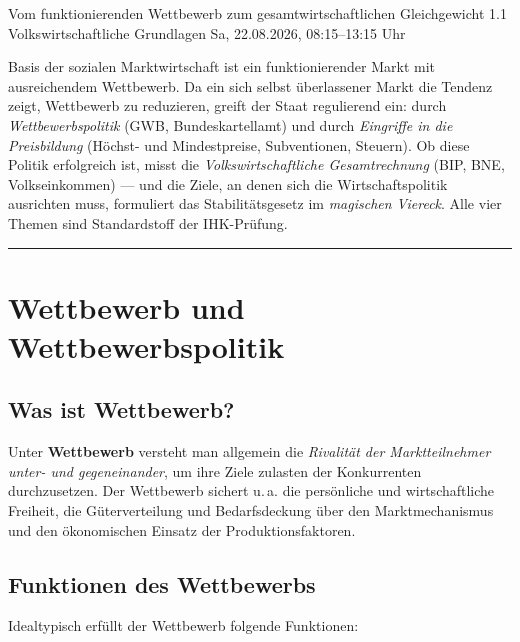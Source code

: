 \documentclass[11pt, a4paper]{article}
\begin{document}
%
  {Vom funktionierenden Wettbewerb zum gesamtwirtschaftlichen Gleichgewicht}%
  {1.1 Volkswirtschaftliche Grundlagen}%
  {Sa, 22.08.2026, 08:15--13:15 Uhr}

\begin{merksatz}[title={\bfseries Worum geht es in dieser Lektion?}]
Basis der sozialen Marktwirtschaft ist ein funktionierender Markt mit ausreichendem
Wettbewerb. Da ein sich selbst überlassener Markt die Tendenz zeigt, Wettbewerb zu
reduzieren, greift der Staat regulierend ein: durch \emph{Wettbewerbspolitik} (GWB,
Bundeskartellamt) und durch \emph{Eingriffe in die Preisbildung} (Höchst- und
Mindestpreise, Subventionen, Steuern). Ob diese Politik erfolgreich ist, misst die
\emph{Volkswirtschaftliche Gesamtrechnung} (BIP, BNE, Volkseinkommen) --- und die Ziele,
an denen sich die Wirtschaftspolitik ausrichten muss, formuliert das Stabilitätsgesetz
im \emph{magischen Viereck}. Alle vier Themen sind Standardstoff der IHK-Prüfung.
\end{merksatz}

\tableofcontents
\vspace{1em}
\hrule
\vspace{1em}

\section{Wettbewerb und Wettbewerbspolitik}

\subsection{Was ist Wettbewerb?}

Unter \textbf{Wettbewerb} versteht man allgemein die \emph{Rivalität der Marktteilnehmer
unter- und gegeneinander}, um ihre Ziele zulasten der Konkurrenten durchzusetzen. Der
Wettbewerb sichert u.\,a. die persönliche und wirtschaftliche Freiheit, die
Güterverteilung und Bedarfsdeckung über den Marktmechanismus und den ökonomischen
Einsatz der Produktionsfaktoren.

\subsection{Funktionen des Wettbewerbs}

Idealtypisch erfüllt der Wettbewerb folgende Funktionen:
\end{document}
